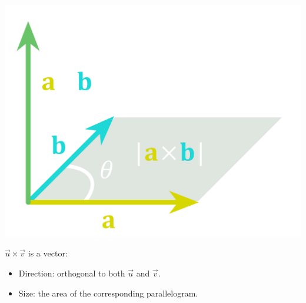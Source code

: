 \documentclass[pdf,9pt]{beamer}
\begin{document}
{{\begin{center}
    \includegraphics[scale=0.03]{./figures/Cross_product_parallelogram.png}
\end{center}

\begin{remark}
$\vec{u}\times\vec{v}$ is a vector:
\begin{itemize}
    \item Direction: orthogonal to both $\vec{u}$ and $\vec{v}$.
    \item Size: the area of the corresponding parallelogram.
\end{itemize}
\end{remark}

}}
\end{document}
